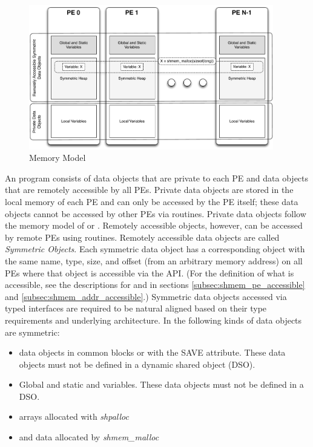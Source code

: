 \begin{figure}[h]
\includegraphics[width=0.95\textwidth]{figures/mem_model}      
\caption{\OSH Memory Model}                                   
\label{fig:mem_model}                                               
\end{figure}      
%
An \openshmem program consists of data objects that are private to each \ac{PE}
and data  objects that are remotely accessible by all \ac{PE}s. Private data
objects are stored in the local memory of each \ac{PE} and can only be accessed
by the \ac{PE} itself; these data objects cannot be accessed by other \ac{PE}s
via \openshmem routines. Private data objects follow the memory model of
\Clang or \Fortran. Remotely accessible objects, however, can be accessed by
remote \ac{PE}s using \openshmem routines.  Remotely accessible data objects are
called \emph{Symmetric Objects}.  Each symmetric data object has a corresponding
object with the same name, type, size, and offset (from an arbitrary memory
address) on all PEs where that object is accessible via the \openshmem \ac{API}.
(For the definition of what is accessible, see the descriptions for
 and  in sections
\ref{subsec:shmem_pe_accessible} and \ref{subsec:shmem_addr_accessible}.)
Symmetric data objects accessed via typed \openshmem interfaces are required to
be natural aligned based on their type requirements and underlying architecture.
In \openshmem the following kinds of data objects are symmetric:
%
\begin{itemize}
  \item \Fortran data objects in common blocks or with the  SAVE  attribute.
      These data objects must not be defined in a dynamic shared object (DSO).
  \item Global and static \Clang and \Cpp variables. These data objects must
      not  be defined in a DSO.
  \item \Fortran arrays allocated with \textit{shpalloc} 
  \item \Clang and \Cpp data allocated by \textit{shmem\_malloc}
\end{itemize}       

